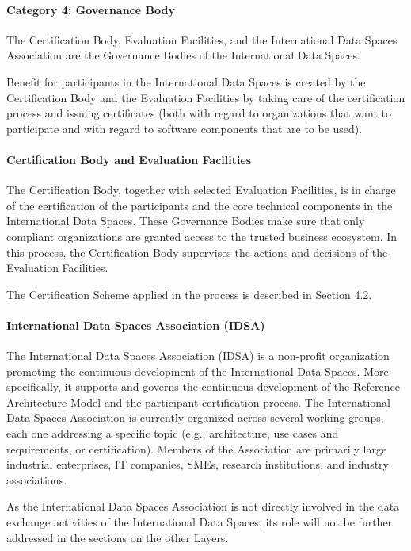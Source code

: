 \paragraph{Category 4: Governance Body}
The Certification Body, Evaluation Facilities, and the International Data Spaces Association are the Governance Bodies of the International Data Spaces.

Benefit for participants in the International Data Spaces is created by the Certification Body and the Evaluation Facilities by taking care of the certification process and issuing certificates (both with regard to organizations that want to participate and with regard to software components that are to be used).

\paragraph{Certification Body and Evaluation Facilities}
The Certification Body, together with selected Evaluation Facilities, is in charge of the certification of the participants and the core technical components in the International Data Spaces. These Governance Bodies make sure that only compliant organizations are granted access to the trusted business ecosystem.  In this process, the Certification Body supervises the actions and decisions of the Evaluation Facilities. 

The Certification Scheme applied in the process is described in Section 4.2. %

\paragraph{International Data Spaces Association (IDSA)}
The International Data Spaces Association (IDSA) is a non-profit organization promoting the continuous development of the International Data Spaces. More specifically, it supports and governs the continuous development of the Reference Architecture Model and the participant certification process. The International Data Spaces Association is currently organized across several working groups, each one addressing a specific topic (e.g., architecture, use cases and requirements, or certification). Members of the Association are primarily large industrial enterprises, IT companies, SMEs, research institutions, and industry associations.

As the International Data Spaces Association is not directly involved in the data exchange activities of the International Data Spaces, its role will not be further addressed in the sections on the other Layers.


